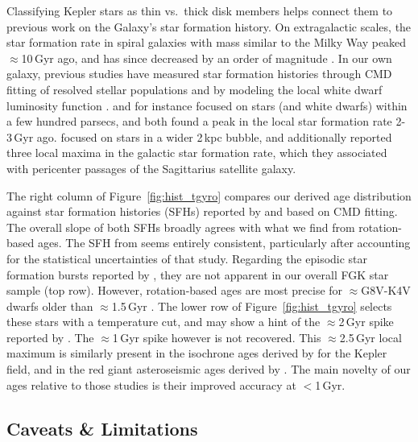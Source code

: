 \documentclass[11pt,twocolumn,tighten,linenumbers,trackchanges]{aastex63}
\begin{document}
Classifying Kepler stars as thin vs.\ thick disk members helps connect
them to previous work on the Galaxy's star formation history.  On
extragalactic scales, the star formation rate in spiral galaxies with
mass similar to the Milky Way peaked $\approx$10\,Gyr ago, and has
since decreased by an order of magnitude
\citep[e.g.][]{2004Natur.428..625H,2006ApJ...651..142H}.  In our own
galaxy, previous studies have measured star formation histories
through CMD fitting of resolved stellar populations
\citep[][]{2019A&A...624L...1M,2020NatAs...4..965R,2021MNRAS.501..302A,2022Natur.603..599X}
and by modeling the local white dwarf luminosity function
\citep[e.g.][]{2019ApJ...878L..11I}.  \citet{2019A&A...624L...1M} and
\citet{2019ApJ...878L..11I} for instance focused on stars (and white
dwarfs) within a few hundred parsecs, and both found a peak in the
local star formation rate 2-3\,Gyr ago.  \citet{2020NatAs...4..965R}
focused on stars in a wider 2\,kpc bubble, and additionally reported
three local maxima in the galactic star formation rate, which they
associated with pericenter passages of the Sagittarius satellite
galaxy.

The right column of Figure~\ref{fig:hist_tgyro} compares our derived
age distribution against star formation histories (SFHs) reported by
\citet{2019A&A...624L...1M} and \citet{2020NatAs...4..965R} based on
CMD fitting.  The overall slope of both SFHs broadly agrees with what
we find from rotation-based ages.  The SFH from
\citet{2019A&A...624L...1M} seems entirely consistent, particularly
after accounting for the statistical uncertainties of that study.
Regarding the episodic star formation bursts reported by
\citet{2020NatAs...4..965R}, they are not apparent in our overall FGK
star sample (top row).  However, rotation-based ages are most precise
for $\approx$G8V-K4V dwarfs older than $\approx$1.5\,Gyr
\citep{Bouma_2023}.  The lower row of Figure~\ref{fig:hist_tgyro}
selects these stars with a temperature cut, and may show a hint of the
$\approx$2\,Gyr spike reported by \citet{2020NatAs...4..965R}.  The
$\approx$1\,Gyr spike however is not recovered.  This
$\approx$2.5\,Gyr local maximum is similarly present in the isochrone
ages derived by \citet{Berger_2020a_catalog} for the Kepler field, and
in the red giant asteroseismic ages derived by
\citet{SilvaAguirre2018}.  The main novelty of our ages relative to
those studies is their improved accuracy at $<$1\,Gyr.


\subsection{Caveats \& Limitations}
\label{subsec:caveats}
\end{document}
